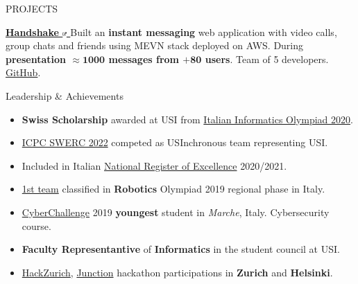 \documentclass{cv} %
\def\intraexpvspace{0.15cm}
\begin{document}
\begin{minipage}[b][0.9\paperheight][t]{0.7\linewidth}
\begin{rSection}{PROJECTS}
        \vspace{\intraexpvspace}
        \item \textbf{\href{https://handshakeapp.ch}{
                Handshake
                \includegraphics[width=0.15cm, trim={10cm -10cm 0cm 0cm}]{ext-link-icon.png}
            }}
        {Built an \textbf{instant messaging} web application with video calls, group chats and friends
            using MEVN stack deployed on AWS.
            During \textbf{presentation $\boldsymbol{\approx1000}$ messages from $\boldsymbol{+ 80}$ users}.
            Team of 5 developers.
            \href{https://github.com/ogs-at-usi/handshake}{GitHub}.
        }
    \end{rSection}
    \begin{rSection}{Leadership \& Achievements}
        \vspace{0.2cm}
        \begin{itemize}[leftmargin=*]
            \itemsep 0.2em
            \item \textbf{Swiss Scholarship} awarded at USI from
                  \href{https://www.olimpiadi-informatica.it/index.php/selezione-territoriale-20.html}{Italian Informatics Olympiad 2020}.

            \item \href{https://icpc.global/ICPCID/ZOI3HF9XDUH8}{ICPC SWERC 2022}
                  competed as USInchronous team representing USI.

            \item Included in Italian \href{https://www.indire.it/eccellenze/}{National Register of Excellence} 2020/2021.

            \item \href{https://www.makerslab.it/olimpiadi-robotiche-ancona-2019/}{1st team}
                  classified in \textbf{Robotics} Olympiad 2019 regional phase in Italy. %

            \item \href{https://cyberchallenge.it/}{CyberChallenge} 2019 \textbf{youngest} student
                  in \textit{Marche}, Italy. Cybersecurity course. %

            \item \textbf{Faculty Representantive} of \textbf{Informatics} in the student council at USI.

            \item \href{https://hackzurich.com/}{HackZurich},
                  \href{https://www.junction2023.com/}{Junction}
                  hackathon participations in \textbf{Zurich} and \textbf{Helsinki}.
        \end{itemize}
    \end{rSection}

\end{minipage}
\end{document}
